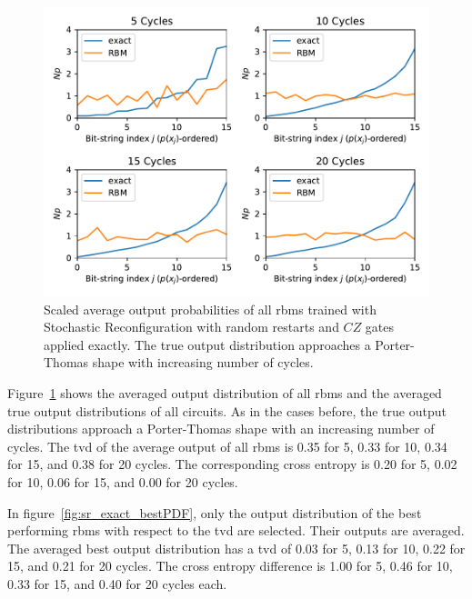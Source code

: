 \begin{figure}[H]
  \centering
  \includegraphics[width=\textwidth]{figures/results/sr-restarts-not-learned/avgPDF.pdf}
  \caption[Scaled Average Output Probabilities of All RBMs Trained with Stochastic Reconfiguration with Random Restarts and $CZ$ Gates Applied Exactly]{
    Scaled average output probabilities of all \gls{rbm}s trained with Stochastic Reconfiguration with random restarts and $CZ$ gates applied exactly. The true 
    output distribution approaches a Porter-Thomas shape with increasing number of cycles.}
  \label{fig:sr_exact_avgPDF}
\end{figure}

Figure~\ref{fig:sr_exact_avgPDF} shows the averaged output distribution of all \gls{rbm}s and
the averaged true output distributions of all circuits. As in the cases before, the 
true output distributions approach a Porter-Thomas shape with an increasing number of cycles.
The \gls{tvd} of the average output of all \gls{rbm}s 
is 0.35 for 5, 0.33 for 10, 0.34 for 15, and 0.38 for 20 cycles. The corresponding cross entropy is 
0.20 for 5, 0.02 for 10, 0.06 for 15, and 0.00 for 20 cycles.

In figure~\ref{fig:sr_exact_bestPDF}, only the output distribution of the best performing \gls{rbm}s with respect to the 
\gls{tvd} are selected. Their outputs are averaged. The averaged best output distribution 
has a \gls{tvd} of 0.03 for 5, 0.13 for 10, 0.22 for 15, and 0.21 for 20 
cycles. The cross entropy difference is 1.00 for 5, 0.46 for 10, 0.33 for 15, and 0.40 for 20 cycles each. 


